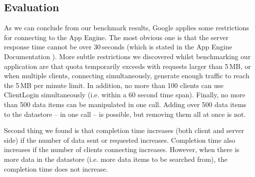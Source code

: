 \subsection{Evaluation}
As we can conclude from our benchmark results, Google applies some restrictions
for connecting to the App Engine. The most obvious one is that the
server response time cannot be over 30\,seconds (which is stated in the App
Engine Documentation \cite{app-engine-quotas}). More subtle restrictions we
discovered whilst benchmarking our application are that quota temporarily exceeds
with requests larger than 5\,MB, or when multiple clients, connecting
simultaneously, generate enough traffic to reach the 5\,MB per minute limit.
In addition, no more than 100 clients can use ClientLogin simultaneously (i.e.
within a 60 second time span). Finally, no more than 500 data items can be
manipulated in one call. Adding over 500 data items to the datastore -- in one
call -- is possible, but removing them all at once is not.

Second thing we found is that completion time increases (both client and server
side) if the number of data sent or requested increases. Completion time also
increases if the number of clients connecting increases. However, when there is
more data in the datastore (i.e. more data items to be searched from), the
completion time does not increase.
